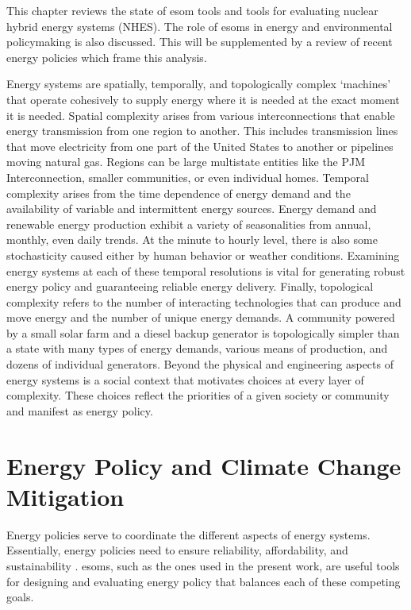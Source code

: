 This chapter reviews the state of \gls{esom} tools
and tools for evaluating nuclear hybrid energy systems (NHES). The role of \glspl{esom}
in energy and environmental policymaking is also discussed. This will be
supplemented by a review of recent energy policies which frame this analysis.

Energy systems are spatially, temporally, and topologically complex ‘machines’
that operate cohesively to supply energy where it is needed at the exact moment
it is needed. Spatial complexity arises from various interconnections that enable
energy transmission from one region to another. This includes transmission
lines that move electricity from one part of the United States to another or
pipelines moving natural gas. Regions can be large multistate entities like the
PJM Interconnection, smaller communities, or even individual homes. Temporal
complexity arises from the time dependence of energy demand and the availability of
variable and intermittent energy sources. Energy demand and renewable energy
production
exhibit a variety of seasonalities from annual, monthly, even daily trends.
At the minute to hourly level, there is also some stochasticity caused either by
human behavior or weather conditions.
Examining energy systems at each of these temporal resolutions is vital for
generating robust energy policy and guaranteeing reliable energy delivery. Finally,
topological complexity refers to the number of interacting technologies that can
produce and move energy and the number of unique energy demands.
A community powered by a small solar farm and a diesel
backup generator is topologically simpler than a state with many types of energy
demands, various means of production, and dozens of individual generators. Beyond
the physical and engineering aspects of energy systems is a social context that
motivates choices at every layer of complexity. These choices reflect the priorities
of a given society or community and manifest as energy policy.

\section{Energy Policy and Climate Change Mitigation}
\label{section:energy_policy}

Energy policies serve to coordinate the different aspects of energy systems.
Essentially, energy policies need to ensure reliability, affordability, and
sustainability \cite{fattahi_systemic_2020}. \glspl{esom}, such as the ones used
in the present work, are useful tools for designing and evaluating energy policy
that balances each of these competing goals.

